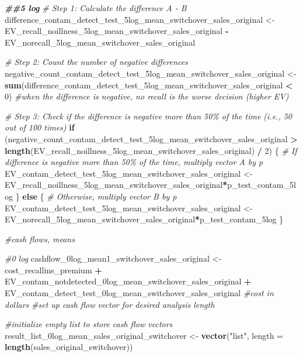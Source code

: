 \documentclass[
]{article}
\newenvironment{Shaded}{\begin{snugshade}}{\end{snugshade}}
\newcommand{\AttributeTok}[1]{\textcolor[rgb]{0.13,0.29,0.53}{#1}}
\newcommand{\CommentTok}[1]{\textcolor[rgb]{0.56,0.35,0.01}{\textit{#1}}}
\newcommand{\ControlFlowTok}[1]{\textcolor[rgb]{0.13,0.29,0.53}{\textbf{#1}}}
\newcommand{\DecValTok}[1]{\textcolor[rgb]{0.00,0.00,0.81}{#1}}
\newcommand{\DocumentationTok}[1]{\textcolor[rgb]{0.56,0.35,0.01}{\textbf{\textit{#1}}}}
\newcommand{\FunctionTok}[1]{\textcolor[rgb]{0.13,0.29,0.53}{\textbf{#1}}}
\newcommand{\NormalTok}[1]{#1}
\newcommand{\OtherTok}[1]{\textcolor[rgb]{0.56,0.35,0.01}{#1}}
\newcommand{\SpecialCharTok}[1]{\textcolor[rgb]{0.81,0.36,0.00}{\textbf{#1}}}
\newcommand{\StringTok}[1]{\textcolor[rgb]{0.31,0.60,0.02}{#1}}
\begin{document}
\begin{Shaded}
\begin{Highlighting}[]
\DocumentationTok{\#\#5 log}
\CommentTok{\# Step 1: Calculate the difference A {-} B}
\NormalTok{difference\_contam\_detect\_test\_5log\_mean\_switchover\_sales\_original }\OtherTok{\textless{}{-}}\NormalTok{ EV\_recall\_noillness\_5log\_mean\_switchover\_sales\_original }\SpecialCharTok{{-}}\NormalTok{ EV\_norecall\_5log\_mean\_switchover\_sales\_original}

\CommentTok{\# Step 2: Count the number of negative differences}
\NormalTok{negative\_count\_contam\_detect\_test\_5log\_mean\_switchover\_sales\_original }\OtherTok{\textless{}{-}} \FunctionTok{sum}\NormalTok{(difference\_contam\_detect\_test\_5log\_mean\_switchover\_sales\_original }\SpecialCharTok{\textless{}} \DecValTok{0}\NormalTok{) }\CommentTok{\#when the difference is negative, no recall is the worse decision (higher EV)}

\CommentTok{\# Step 3: Check if the difference is negative more than 50\% of the time (i.e., 50 out of 100 times)}
\ControlFlowTok{if}\NormalTok{ (negative\_count\_contam\_detect\_test\_5log\_mean\_switchover\_sales\_original }\SpecialCharTok{\textgreater{}} \FunctionTok{length}\NormalTok{(EV\_recall\_noillness\_5log\_mean\_switchover\_sales\_original) }\SpecialCharTok{/} \DecValTok{2}\NormalTok{) \{}
  \CommentTok{\# If difference is negative more than 50\% of the time, multiply vector A by p}
\NormalTok{  EV\_contam\_detect\_test\_5log\_mean\_switchover\_sales\_original }\OtherTok{\textless{}{-}}\NormalTok{ EV\_recall\_noillness\_5log\_mean\_switchover\_sales\_original}\SpecialCharTok{*}\NormalTok{p\_test\_contam\_5log}
\NormalTok{\} }\ControlFlowTok{else}\NormalTok{ \{}
  \CommentTok{\# Otherwise, multiply vector B by p}
\NormalTok{ EV\_contam\_detect\_test\_5log\_mean\_switchover\_sales\_original  }\OtherTok{\textless{}{-}}\NormalTok{ EV\_norecall\_5log\_mean\_switchover\_sales\_original}\SpecialCharTok{*}\NormalTok{p\_test\_contam\_5log}
\NormalTok{\}}


\CommentTok{\#cash flows, means}

\CommentTok{\#0 log}
\NormalTok{cashflow\_0log\_mean1\_switchover\_sales\_original }\OtherTok{\textless{}{-}}\NormalTok{ cost\_recallins\_premium }\SpecialCharTok{+}\NormalTok{ EV\_contam\_notdetected\_0log\_mean\_switchover\_sales\_original }\SpecialCharTok{+}\NormalTok{ EV\_contam\_detect\_test\_0log\_mean\_switchover\_sales\_original }\CommentTok{\#cost in dollars}
\CommentTok{\#set up cash flow vector for desired analysis length}

\CommentTok{\#initialize empty list to store cash flow vectors}
\NormalTok{result\_list\_0log\_mean\_sales\_original\_switchover }\OtherTok{\textless{}{-}} \FunctionTok{vector}\NormalTok{(}\StringTok{"list"}\NormalTok{, }\AttributeTok{length =} \FunctionTok{length}\NormalTok{(sales\_original\_switchover))}



\end{Highlighting}
\end{Shaded}
\end{document}

